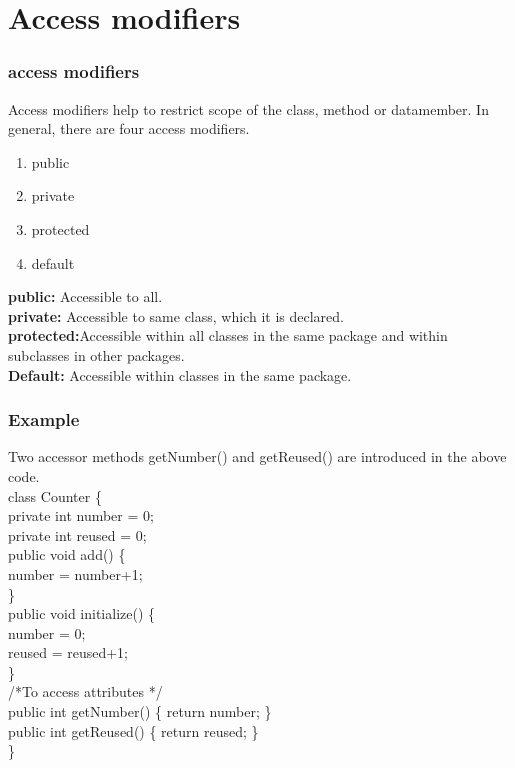 \documentclass{beamer}
\begin{document}
\section{Access modifiers}
\begin{frame}
    \frametitle{access modifiers}
    Access modifiers help to restrict scope of the class, method or datamember.
    In general, there are four access modifiers.
    \begin{enumerate}
        \item public
        \item private
        \item protected
        \item default
    \end{enumerate}
    \textbf{public:} Accessible to all.\\
    \textbf{private:} Accessible to same class, which it is declared.\\
    \textbf{protected:}Accessible within all classes in the same package and within subclasses in other packages.\\
    \textbf{Default:} Accessible within classes in the same package.
\end{frame}
\begin{frame}
\frametitle{Example}
Two accessor methods getNumber() and getReused() are introduced in the above code.\\
class Counter \{\\
private int number = 0;\\
private int reused = 0;\\
public void add() \{\\
number = number+1;\\
\}\\
public void initialize() \{\\
number = 0;\\
reused = reused+1;\\
\}\\
/*To access attributes */ \\
public int getNumber() \{ return number; \} \\
public int getReused() \{ return reused; \}\\
\}\\
\end{frame}
\end{document}
